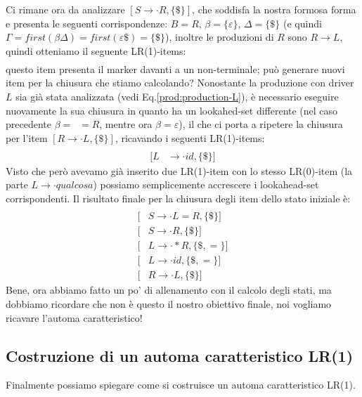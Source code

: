 \documentclass[class=book, crop=false, oneside, 12pt]{standalone}
\begin{document}
Ci rimane ora da analizzare \([S \to \cdot R, \{\$\}]\), che soddisfa la nostra formosa forma e presenta le seguenti corrispondenze: \(B = R \texttt{, } \beta = \{\varepsilon\} \texttt{, } \Delta = \{\$\}\) (e quindi \(\Gamma = first(\beta \Delta) = first(\varepsilon \$) = \{\$\}\)), inoltre le produzioni di \(R\) sono \(R \to L\), quindi otteniamo il seguente LR(1)-items:
\begin{align*}
    [R &\to \cdot L, \{\$\}]
\end{align*}
questo item presenta il marker davanti a un non-terminale; può generare nuovi item per la chiusura che stiamo calcolando?
Nonostante la produzione con driver \(L\) sia già stata analizzata (vedi Eq.\ref{prod:production-L}), è necessario eseguire nuovamente la sua chiusura in quanto ha un lookahed-set differente (nel caso precedente \(\beta= \; \;  =R\), mentre ora \(\beta=\varepsilon\)), il che ci porta a ripetere la chiusura per l'item \([R \to \cdot L, \{\$\}]\), ricavando i seguenti LR(1)-items:
\begin{align*}
    [L &\to \cdot *R, \{\$\}] \\
    [L &\to \cdot id, \{\$\}]
\end{align*}
Visto che però avevamo già inserito due LR(1)-item con lo stesso LR(0)-item (la parte \(L \to \cdot qualcosa\)) possiamo semplicemente accrescere i lookahead-set corrispondenti. Il risultato finale per la chiusura degli item dello stato iniziale è:
\begin{align*}
    [&S'\to \cdot S, \{\$\}] \\
    [&S \to \cdot L = R, \{\$\}] \\
    [&S \to \cdot R, \{\$\}] \\
    [&L \to \cdot *R, \{\$, =\}] \\
    [&L \to \cdot id, \{\$, =\}] \\
    [&R \to \cdot L, \{\$\}]
\end{align*}
Bene, ora abbiamo fatto un po' di allenamento con il calcolo degli stati, ma dobbiamo ricordare che non è questo il nostro obiettivo finale, noi vogliamo ricavare l'automa caratteristico!

\subsection{Costruzione di un automa caratteristico LR(1)}
Finalmente possiamo spiegare come si costruisce un automa caratteristico LR(1). 
\end{document}
